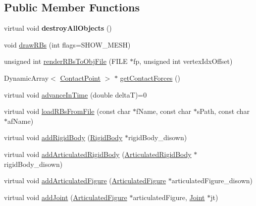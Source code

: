 \subsection*{Public Member Functions}
\begin{DoxyCompactItemize}
\item 
\hypertarget{classCartWheel_1_1Physics_1_1World_a2928f8735d1225c68b32763c004d0c28}{
virtual void {\bfseries destroyAllObjects} ()}
\label{classCartWheel_1_1Physics_1_1World_a2928f8735d1225c68b32763c004d0c28}

\item 
void \hyperlink{classCartWheel_1_1Physics_1_1World_aaeb871501b82144005d7c83ad6d88aeb}{drawRBs} (int flags=SHOW\_\-MESH)
\item 
unsigned int \hyperlink{classCartWheel_1_1Physics_1_1World_a78f3fa0d8ff370a6ca8a5e15d7a14bf4}{renderRBsToObjFile} (FILE $\ast$fp, unsigned int vertexIdxOffset)
\item 
DynamicArray$<$ \hyperlink{classCartWheel_1_1Physics_1_1ContactPoint}{ContactPoint} $>$ $\ast$ \hyperlink{classCartWheel_1_1Physics_1_1World_ae658eb78dc8f1d3d665c61a3d07c45d3}{getContactForces} ()
\item 
virtual void \hyperlink{classCartWheel_1_1Physics_1_1World_a289b113bee05b81baecebe76bc384069}{advanceInTime} (double deltaT)=0
\item 
virtual void \hyperlink{classCartWheel_1_1Physics_1_1World_a0602db984b22bbc3d13162a9ec07eb73}{loadRBsFromFile} (const char $\ast$fName, const char $\ast$sPath, const char $\ast$afName)
\item 
virtual void \hyperlink{classCartWheel_1_1Physics_1_1World_a1ca9b7e988c6f36f136cce897d0f49d8}{addRigidBody} (\hyperlink{classCartWheel_1_1Physics_1_1RigidBody}{RigidBody} $\ast$rigidBody\_\-disown)
\item 
virtual void \hyperlink{classCartWheel_1_1Physics_1_1World_a3804e4088fe10df5c4c08fde98bcbadc}{addArticulatedRigidBody} (\hyperlink{classCartWheel_1_1Physics_1_1ArticulatedRigidBody}{ArticulatedRigidBody} $\ast$rigidBody\_\-disown)
\item 
virtual void \hyperlink{classCartWheel_1_1Physics_1_1World_af98e74c3270d1d55dc0990be78653214}{addArticulatedFigure} (\hyperlink{classCartWheel_1_1Physics_1_1ArticulatedFigure}{ArticulatedFigure} $\ast$articulatedFigure\_\-disown)
\item 
virtual void \hyperlink{classCartWheel_1_1Physics_1_1World_a4e4033d358b1654796aa3c3463fa875a}{addJoint} (\hyperlink{classCartWheel_1_1Physics_1_1ArticulatedFigure}{ArticulatedFigure} $\ast$articulatedFigure, \hyperlink{classCartWheel_1_1Physics_1_1Joint}{Joint} $\ast$jt)

\end{DoxyCompactItemize}
